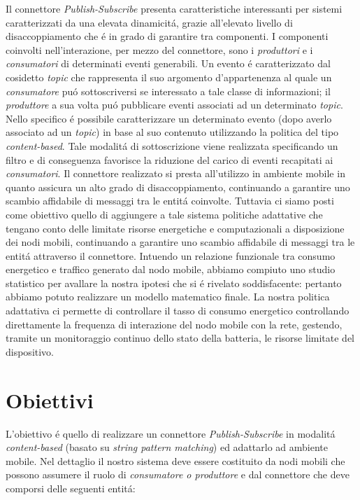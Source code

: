 \documentclass{article}
\begin{document}
Il connettore \textit{Publish-Subscribe} presenta caratteristiche interessanti per sistemi caratterizzati da una elevata dinamicit\'a, grazie all'elevato livello di disaccoppiamento che \'e in grado di garantire tra componenti. I componenti coinvolti nell'interazione, per mezzo del connettore, sono i \textit{produttori} e i \textit{consumatori} di determinati eventi generabili. Un evento \'e caratterizzato dal cosidetto \textit{topic} che rappresenta il suo argomento d'appartenenza al quale un \textit{consumatore} pu\'o sottoscriversi se interessato a tale classe di informazioni; il \textit{produttore} a sua volta pu\'o pubblicare eventi associati ad un determinato \textit{topic}. Nello specifico \'e possibile caratterizzare un determinato evento (dopo averlo associato ad un \textit{topic}) in base al suo contenuto utilizzando la politica del tipo \textit{content-based}. Tale modalit\'a di sottoscrizione viene realizzata specificando un filtro e di conseguenza favorisce la riduzione del carico di eventi recapitati ai \textit{consumatori}. Il connettore realizzato si presta all'utilizzo in ambiente mobile in quanto assicura un alto grado di disaccoppiamento, continuando a garantire uno scambio affidabile di messaggi tra le entit\'a coinvolte. Tuttavia ci siamo posti come obiettivo quello di aggiungere a tale sistema politiche adattative che tengano conto delle limitate risorse energetiche e computazionali a disposizione dei nodi mobili, continuando a garantire uno scambio affidabile di messaggi tra le entit\'a attraverso il connettore.
Intuendo un relazione funzionale tra consumo energetico e traffico generato dal nodo mobile, abbiamo compiuto uno studio statistico per avallare la nostra ipotesi che si \'e rivelato soddisfacente: pertanto abbiamo potuto realizzare un modello matematico finale. 
La nostra politica adattativa ci permette di controllare il tasso di consumo energetico controllando direttamente la frequenza di interazione del nodo mobile con la rete, gestendo, tramite un monitoraggio continuo dello stato della batteria, le risorse limitate del dispositivo. %

\section{Obiettivi}

L'obiettivo \'e quello di realizzare un connettore \textit{Publish-Subscribe} in modalit\'a \textit{content-based} (basato su \textit{string pattern matching}) ed adattarlo ad ambiente mobile. Nel dettaglio il nostro sistema deve essere costituito da nodi mobili che possono assumere il ruolo di \textit{consumatore o produttore} e dal connettore che deve comporsi delle seguenti entit\'a:
\end{document}

